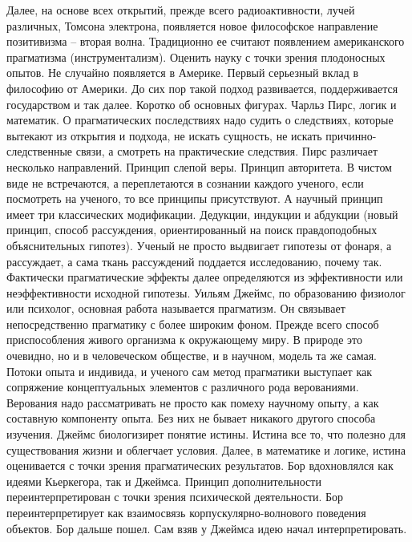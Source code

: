 \documentclass[a4paper, 12pt]{article}
\begin{document}
Далее, на основе всех открытий, прежде всего радиоактивности, лучей 
различных, Томсона электрона, появляется новое философское направление 
позитивизма -- вторая волна. Традиционно ее считают появлением 
американского прагматизма (инструментализм). Оценить науку с точки 
зрения плодоносных опытов. Не случайно появляется в Америке. Первый 
серьезный вклад в философию от Америки. До сих пор такой подход 
развивается, поддерживается государством и так далее. Коротко об 
основных фигурах. Чарльз Пирс, логик и математик. О прагматических 
последствиях надо судить о следствиях, которые вытекают из открытия 
и подхода, не искать сущность, не искать причинно-следственные связи, 
а смотреть на практические следствия. Пирс различает несколько 
направлений. Принцип слепой веры. Принцип авторитета. В чистом виде не 
встречаются, а переплетаются в сознании каждого ученого, если посмотреть 
на ученого, то все принципы присутствуют. А научный принцип имеет три 
классических модификации. Дедукции, индукции и абдукции (новый принцип, 
способ рассуждения, ориентированный на поиск правдоподобных 
объяснительных гипотез). Ученый не просто выдвигает гипотезы от фонаря, 
а рассуждает, а сама ткань рассуждений поддается исследованию, почему 
так. Фактически прагматические эффекты далее определяются из 
эффективности или неэффективности исходной гипотезы. Уильям Джеймс, по 
образованию физиолог или психолог, основная работа называется 
прагматизм. Он связывает непосредственно прагматику с более широким 
фоном. Прежде всего способ приспособления живого организма к окружающему 
миру. В природе это очевидно, но и в человеческом обществе, и в научном, 
модель та же самая. Потоки опыта и индивида, и ученого сам метод 
прагматики выступает как сопряжение концептуальных элементов 
с различного рода верованиями. Верования надо рассматривать не просто 
как помеху научному опыту, а как составную компоненту опыта. Без них не 
бывает никакого другого способа изучения. Джеймс биологизирет понятие 
истины. Истина все то, что полезно для существования жизни и облегчает 
условия. Далее, в математике и логике, истина оценивается с точки зрения 
прагматических результатов. Бор вдохновлялся как идеями Кьеркегора, так 
и Джеймса. Принцип дополнительности переинтерпретирован с точки зрения 
психической деятельности. Бор переинтерпретирует как взаимосвязь 
корпускулярно-волнового поведения объектов. Бор дальше пошел. Сам взяв 
у Джеймса идею начал интерпретировать.
\end{document}
